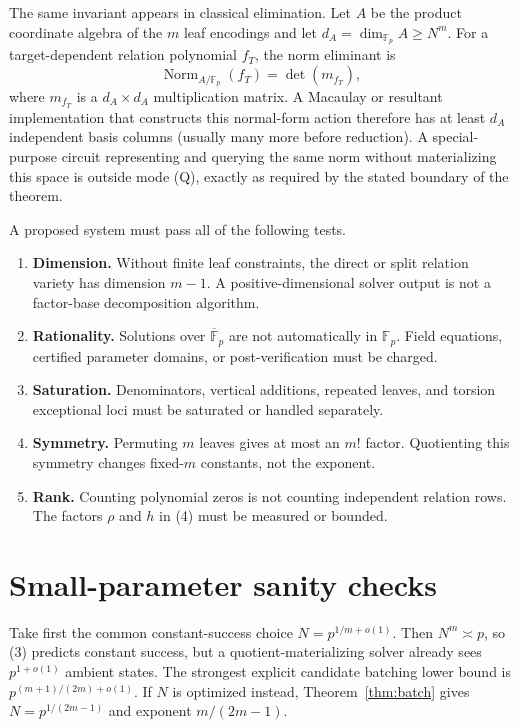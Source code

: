 \documentclass[11pt]{article}
\newcommand{\F}{\mathbb F}
\begin{document}
The same invariant appears in classical elimination.  Let $A$ be the product
coordinate algebra of the $m$ leaf encodings and let
$d_A=\dim_{\F_p}A\ge N^m$.  For a target-dependent relation polynomial $f_T$,
the norm eliminant is
\[
 \operatorname{Norm}_{A/\F_p}(f_T)=\det(m_{f_T}),                  \tag{18}
\]
where $m_{f_T}$ is a $d_A\times d_A$ multiplication matrix.  A Macaulay or
resultant implementation that constructs this normal-form action therefore
has at least $d_A$ independent basis columns (usually many more before
reduction).  A special-purpose circuit representing and querying the same norm
without materializing this space is outside mode (Q), exactly as required by
the stated boundary of the theorem.

A proposed system must pass all of the following tests.
\begin{enumerate}
 \item \textbf{Dimension.}  Without finite leaf constraints, the direct or
 split relation variety has dimension $m-1$.  A positive-dimensional solver
 output is not a factor-base decomposition algorithm.
 \item \textbf{Rationality.}  Solutions over $\overline{\F}_p$ are not
 automatically in $\F_p$.  Field equations, certified parameter domains, or
 post-verification must be charged.
 \item \textbf{Saturation.}  Denominators, vertical additions, repeated leaves,
 and torsion exceptional loci must be saturated or handled separately.
 \item \textbf{Symmetry.}  Permuting $m$ leaves gives at most an $m!$ factor.
 Quotienting this symmetry changes fixed-$m$ constants, not the exponent.
 \item \textbf{Rank.}  Counting polynomial zeros is not counting independent
 relation rows.  The factors $\rho$ and $h$ in (4) must be measured or bounded.
\end{enumerate}

\section{Small-parameter sanity checks}

Take first the common constant-success choice $N=p^{1/m+o(1)}$.  Then
$N^m\asymp p$, so (3) predicts constant success, but a quotient-materializing
solver already sees $p^{1+o(1)}$ ambient states.  The strongest explicit
candidate batching lower bound is $p^{(m+1)/(2m)+o(1)}$.  If $N$ is optimized
instead, Theorem~\ref{thm:batch} gives $N=p^{1/(2m-1)}$ and exponent
$m/(2m-1)$.
\end{document}
